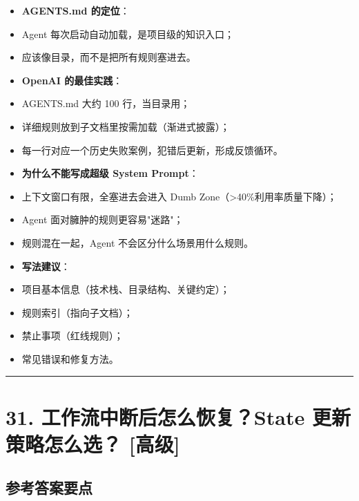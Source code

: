 \documentclass[9pt,a4paper,twocolumn]{ctexart}
\newcommand{\lvgao}{\usebox{\badgegaobox}}
\def\lvgao{[高级]}%
\begin{document}
\begin{itemize}[itemsep=1pt, topsep=2pt]
  \item \textbf{AGENTS.md 的定位}：
  \item Agent 每次启动自动加载，是项目级的知识入口；
  \item 应该像目录，而不是把所有规则塞进去。
  \item \textbf{OpenAI 的最佳实践}：
  \item AGENTS.md 大约 100 行，当目录用；
  \item 详细规则放到子文档里按需加载（渐进式披露）；
  \item 每一行对应一个历史失败案例，犯错后更新，形成反馈循环。
  \item \textbf{为什么不能写成超级 System Prompt}：
  \item 上下文窗口有限，全塞进去会进入 Dumb Zone（>40\%利用率质量下降）；
  \item Agent 面对臃肿的规则更容易"迷路"；
  \item 规则混在一起，Agent 不会区分什么场景用什么规则。
  \item \textbf{写法建议}：
  \item 项目基本信息（技术栈、目录结构、关键约定）；
  \item 规则索引（指向子文档）；
  \item 禁止事项（红线规则）；
  \item 常见错误和修复方法。
\end{itemize}


\vspace{2pt}
\noindent\rule{\columnwidth}{0.3pt}\vspace{2pt}



\section*{31. 工作流中断后怎么恢复？State 更新策略怎么选？ \lvgao{}}


\subsection*{参考答案要点}
\end{document}
